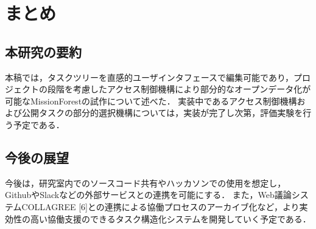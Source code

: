\chapter{まとめ}

\section{本研究の要約}
本稿では，タスクツリーを直感的ユーザインタフェースで編集可能であり，プロジェクトの段階を考慮したアクセス制御機構により部分的なオープンデータ化が可能なMissionForestの試作について述べた．
実装中であるアクセス制御機構および公開タスクの部分的選択機構については，実装が完了し次第，評価実験を行う予定である．

\section{今後の展望}
今後は，研究室内でのソースコード共有やハッカソンでの使用を想定し，GithubやSlackなどの外部サービスとの連携を可能にする．
また，Web議論システムCOLLAGREE [6]との連携による協働プロセスのアーカイブ化など，より実効性の高い協働支援のできるタスク構造化システムを開発していく予定である．

